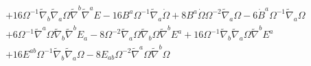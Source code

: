 \documentclass[10pt,letterpaper]{article}
\numberwithin{equation}{section}
\begin{document}
\begin{eqnarray}
&& + 16 \Omega^{-1} \tilde{\nabla}_{b}\tilde{\nabla}_{a}\Omega \tilde{\nabla}^{b}\tilde{\nabla}^{a}E
-16 B^{a} \Omega^{-1} \tilde{\nabla}_{a}\dot{\Omega}
+ 8 B^{a} \dot{\Omega} \Omega^{-2} \tilde{\nabla}_{a}\Omega
- 6 \dot{B}^{a} \Omega^{-1} \tilde{\nabla}_{a}\Omega
\nonumber\\
&&
+ 6 \Omega^{-1} \tilde{\nabla}^{a}\Omega \tilde{\nabla}_{b}\tilde{\nabla}^{b}E_{a} - 8 \Omega^{-2} \tilde{\nabla}_{a}\Omega \tilde{\nabla}_{b}\Omega \tilde{\nabla}^{b}E^{a}
+ 16 \Omega^{-1} \tilde{\nabla}_{b}\tilde{\nabla}_{a}\Omega \tilde{\nabla}^{b}E^{a}
\nonumber\\
&&+16 E^{ab} \Omega^{-1} \tilde{\nabla}_{b}\tilde{\nabla}_{a}\Omega
- 8 E_{ab} \Omega^{-2} \tilde{\nabla}^{a}\Omega \tilde{\nabla}^{b}\Omega
\end{eqnarray}
%
%
\end{document}
